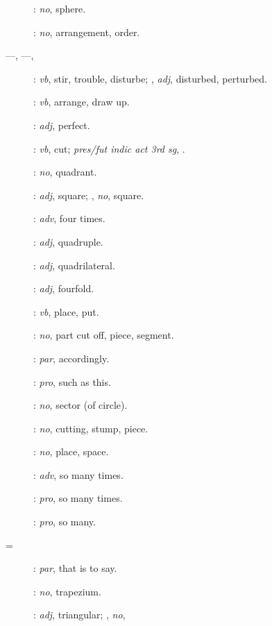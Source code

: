 {\begin{description}
\item[]: {\em no}, sphere.
\item[]: {\em no}, arrangement, order.
\item[ ---, ---, ]: {\em vb}, stir, trouble, disturbe; , {\em adj}, disturbed, perturbed.
\item[]: {\em vb},
arrange, draw up.
\item[]: {\em adj}, perfect.
\item[]:
{\em vb}, cut; {\em pres/fut indic act 3rd sg}, .
\item[]: {\em no}, quadrant.
\item[]: {\em adj}, square; ,
{\em no}, square.
\item[]: {\em adv}, four times.
\item[]: {\em adj}, quadruple.
\item[]: {\em adj}, quadrilateral.
\item[]: {\em adj}, fourfold.
\item[]: {\em vb}, place, put.
\item[]: {\em no}, part cut off, piece, segment.
\item[]: {\em par}, accordingly.
\item[]: {\em pro}, such as this.
\item[]: {\em no}, sector (of circle).
\item[]: {\em no}, cutting, stump, piece.
\item[]: {\em no}, place, space.
\item[]: {\em adv}, so many times.
\item[]: {\em pro}, so many times.
\item[]: {\em pro}, so many.
\item[ = ] : {\em par}, that is to say.
\item[]: {\em no}, trapezium.
\item[]: {\em adj}, triangular; , {\em no},

\end{description}}

